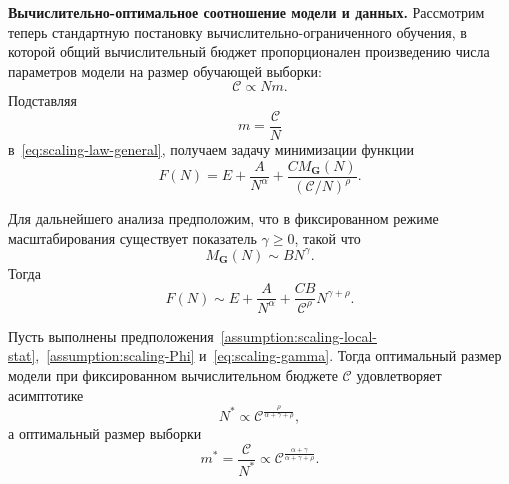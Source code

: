 
\textbf{Вычислительно-оптимальное соотношение модели и данных.} Рассмотрим теперь стандартную постановку вычислительно-ограниченного обучения, в которой общий вычислительный бюджет пропорционален произведению числа параметров модели на размер обучающей выборки:
\begin{equation}
    \label{eq:scaling-compute}
    \mathcal C \propto N m.
\end{equation}
Подставляя
\begin{equation}
    m=\frac{\mathcal C}{N}
\end{equation}
в~\eqref{eq:scaling-law-general}, получаем задачу минимизации функции
\begin{equation}
    \label{eq:scaling-compute-target}
    F(N)
    =
    E
    +
    \frac{A}{N^{\alpha}}
    +
    \frac{C M_{\mathbf G}(N)}{(\mathcal C/N)^{\rho}}.
\end{equation}

Для дальнейшего анализа предположим, что в фиксированном режиме масштабирования существует показатель $\gamma \ge 0$, такой что
\begin{equation}
    \label{eq:scaling-gamma}
    M_{\mathbf G}(N)\sim B N^{\gamma}.
\end{equation}
Тогда
\begin{equation}
    F(N)
    \sim
    E
    +
    \frac{A}{N^{\alpha}}
    +
    \frac{CB}{\mathcal C^{\rho}}N^{\gamma+\rho}.
\end{equation}

\begin{proposition}
    \label{prop:scaling-optimal}
    Пусть выполнены предположения~\ref{assumption:scaling-local-stat},~\ref{assumption:scaling-Phi} и~\eqref{eq:scaling-gamma}. Тогда оптимальный размер модели при фиксированном вычислительном бюджете $\mathcal C$ удовлетворяет асимптотике
    \begin{equation}
        \label{eq:scaling-N-opt}
        N^*
        \propto
        \mathcal C^{\frac{\rho}{\alpha+\gamma+\rho}},
    \end{equation}
    а оптимальный размер выборки
    \begin{equation}
        \label{eq:scaling-m-opt}
        m^*
        =
        \frac{\mathcal C}{N^*}
        \propto
        \mathcal C^{\frac{\alpha+\gamma}{\alpha+\gamma+\rho}}.
    \end{equation}
\end{proposition}

